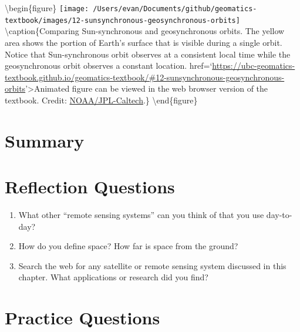 \documentclass[
]{book}
\providecommand{\tightlist}{%
  \setlength{\itemsep}{0pt}\setlength{\parskip}{0pt}}
\begin{document}
\textbackslash begin\{figure\}
\texttt{[image: /Users/evan/Documents/github/geomatics-textbook/images/12-sunsynchronous-geosynchronous-orbits]} \textbackslash caption\{Comparing Sun-synchronous and geosynchronous orbits. The yellow area shows the portion of Earth's surface that is visible during a single orbit. Notice that Sun-synchronous orbit observes at a consistent local time while the geosynchronous orbit observes a constant location. href=`\url{https://ubc-geomatics-textbook.github.io/geomatics-textbook/\#12-sunsynchronous-geosynchronous-orbits}'\textgreater Animated figure can be viewed in the web browser version of the textbook. Credit: \href{https://scijinks.gov/about/}{NOAA/JPL-Caltech}.\}\label{fig:12-sunsynchronous-geosynchronous-orbits}
\textbackslash end\{figure\}

\hypertarget{summary-10}{%
\section{Summary}\label{summary-10}}

\hypertarget{reflection-questions-9}{%
\section*{Reflection Questions}\label{reflection-questions-9}}

\begin{enumerate}
\def\labelenumi{\arabic{enumi}.}
\tightlist
\item
  What other ``remote sensing systems'' can you think of that you use day-to-day?
\item
  How do you define space? How far is space from the ground?
\item
  Search the web for any satellite or remote sensing system discussed in this chapter. What applications or research did you find?
\end{enumerate}

\hypertarget{practice-questions-7}{%
\section*{Practice Questions}\label{practice-questions-7}}
\end{document}
